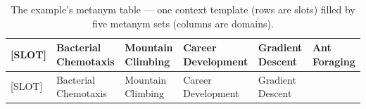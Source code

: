 \begin{longtable}[]{@{}
  >{\raggedright\arraybackslash}p{}
  >{\raggedright\arraybackslash}p{}
  >{\raggedright\arraybackslash}p{}
  >{\raggedright\arraybackslash}p{}
  >{\raggedright\arraybackslash}p{}
  >{\raggedright\arraybackslash}p{}@{}}
\caption{The example's metanym table --- one context template (rows are slots) filled by five metanym sets (columns are domains).}\tabularnewline
\toprule\noalign{}
\begin{minipage}[b]{\linewidth}\raggedright
{[}SLOT{]}
\end{minipage} & \begin{minipage}[b]{\linewidth}\raggedright
Bacterial Chemotaxis
\end{minipage} & \begin{minipage}[b]{\linewidth}\raggedright
Mountain Climbing
\end{minipage} & \begin{minipage}[b]{\linewidth}\raggedright
Career Development
\end{minipage} & \begin{minipage}[b]{\linewidth}\raggedright
Gradient Descent
\end{minipage} & \begin{minipage}[b]{\linewidth}\raggedright
Ant Foraging
\end{minipage} \\
\midrule\noalign{}
\endfirsthead
\toprule\noalign{}
\begin{minipage}[b]{\linewidth}\raggedright
{[}SLOT{]}
\end{minipage} & \begin{minipage}[b]{\linewidth}\raggedright
Bacterial Chemotaxis
\end{minipage} & \begin{minipage}[b]{\linewidth}\raggedright
Mountain Climbing
\end{minipage} & \begin{minipage}[b]{\linewidth}\raggedright
Career Development
\end{minipage} & \begin{minipage}[b]{\linewidth}\raggedright
Gradient Descent
\end{minipage} & \begin{minipage}[b]{\linewidth}\raggedright

\end{minipage}
\end{longtable}
